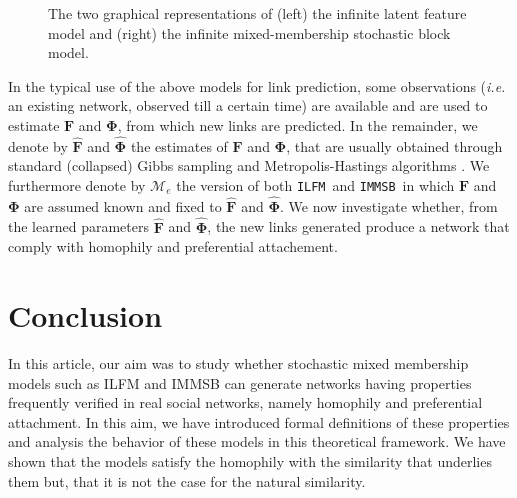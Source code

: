 \documentclass[9pt,twocolumn,twoside]{pnas-new}
\newcommand{\ifm}{\texttt{ILFM}}
\newcommand{\imb}{\texttt{IMMSB}}
\newcommand{\mat}[1]{\mathbf{#1}}
\begin{document}
\begin{figure}[t]
	\centering
	\vspace{1cm}
	\scalebox{0.77}{
	}
	\endminipage
	\scalebox{0.77}{
    }
	\endminipage
	\caption{The two graphical representations of (left) the infinite latent feature model and (right) the infinite mixed-membership stochastic block model.}
	\label{fig:ilfrm}
\end{figure}

In the typical use of the above models for link prediction, some observations (\textit{i.e.} an existing network, observed till a certain time) are available and are used to estimate $\mat{F}$ and $\mat{\Phi}$, from which new links are predicted. In the remainder, we denote by $\mat{\hat{F}}$ and $\mat{\hat{\Phi}}$ the estimates of $\mat{F}$ and $\mat{\Phi}$, that are usually obtained through standard (collapsed) Gibbs sampling and Metropolis-Hastings algorithms \cite{ILFRM,IBP,HDP,diMMSB}. We furthermore denote by $\mathcal{M}_e$ the version of both \ifm\ and \imb\ in which $\mat{F}$ and $\mat{\Phi}$ are assumed known and fixed to $\mat{\hat{F}}$ and $\mat{\hat{\Phi}}$. We now investigate whether, from the learned parameters $\mat{\hat{F}}$ and $\mat{\hat{\Phi}}$, the new links generated produce a network that comply with homophily and preferential attachement.






\section{Conclusion}
In this article, our aim was to study whether stochastic mixed membership models such as ILFM and IMMSB can generate networks having  properties frequently verified in real  social networks, namely  homophily and preferential attachment. 
In this aim, we have introduced formal definitions of  these properties and  analysis the behavior of these models in this theoretical  framework. We have shown that the models satisfy the homophily with the similarity that underlies them but, that it is not the case for the natural similarity. 
\end{document}
